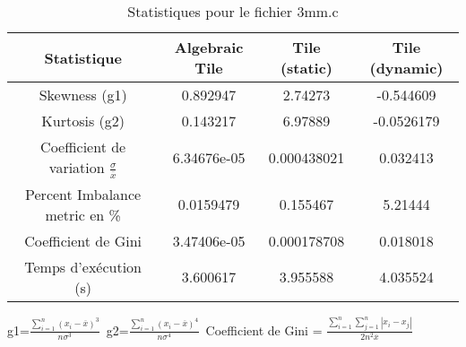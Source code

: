 \documentclass{article}
\begin{document}
\begin{table}[htbp]
  \centering
  \caption{Statistiques pour le fichier 3mm.c}
  \begin{tabular}{|c|c|c|c|}
    \hline
    Statistique & Algebraic Tile & Tile (static) & Tile (dynamic) \\ 
    \hline
    Skewness (g1)  & 0.892947 & 2.74273 & -0.544609 \\ 
    Kurtosis (g2)  & 0.143217 & 6.97889 & -0.0526179 \\ 
    Coefficient de variation $ \frac{\sigma}{\overline{x}} $ & 6.34676e-05 & 0.000438021 & 0.032413\\ 
    Percent Imbalance metric en \% & 0.0159479 & 0.155467 & 5.21444\\ 
    Coefficient de Gini  & 3.47406e-05 & 0.000178708 & 0.018018\\ 
    Temps d'exécution (s) &  3.600617    &  3.955588   &  4.035524   \\ 

    \hline
  \end{tabular}
\end{table}\newline
g1=$ \frac{\sum_{i=1}^{n} (x_i - \overline{x})^3}{n\sigma^3} $\
g2=$ \frac{\sum_{i=1}^{n} (x_i - \overline{x})^4}{n\sigma^4} $\
Coefficient de Gini = $ \frac{\sum_{i=1}^{n}\sum_{j=1}^{n} |x_i - x_j|}{2n^2\overline{x}} $\
\newpage
\end{document}
